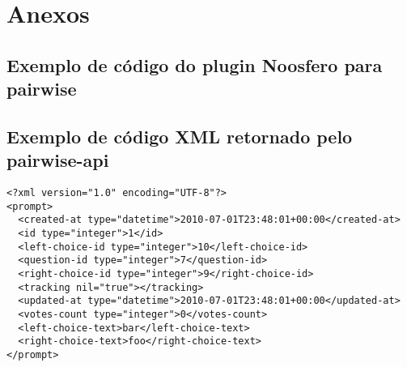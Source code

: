 
\section{Anexos}

\subsection{Exemplo de código do plugin Noosfero para pairwise}



\subsection{Exemplo de código XML retornado pelo pairwise-api}

\begin{lstlisting}
<?xml version="1.0" encoding="UTF-8"?>
<prompt>
  <created-at type="datetime">2010-07-01T23:48:01+00:00</created-at>
  <id type="integer">1</id>
  <left-choice-id type="integer">10</left-choice-id>
  <question-id type="integer">7</question-id>
  <right-choice-id type="integer">9</right-choice-id>
  <tracking nil="true"></tracking>
  <updated-at type="datetime">2010-07-01T23:48:01+00:00</updated-at>
  <votes-count type="integer">0</votes-count>
  <left-choice-text>bar</left-choice-text>
  <right-choice-text>foo</right-choice-text>
</prompt>
\end{lstlisting}
